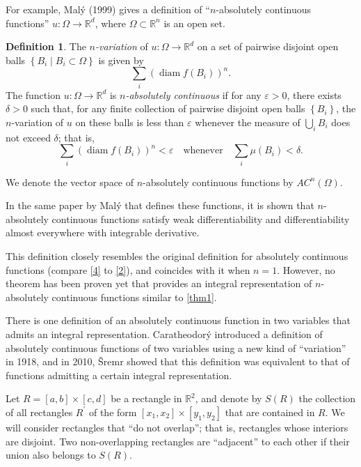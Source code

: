 \documentclass[11pt,leqno]{article}
\theoremstyle{plain}
\theoremstyle{definition}
\newtheorem{definition/}[lem]{Definition}
\newenvironment{definition}
  {\renewcommand{\qedsymbol}{\textdagger}%
   \pushQED{\qed}\begin{definition/}}
  {\popQED\end{definition/}}
\numberwithin{equation}{section}
\numberwithin{lem}{section}
\newcommand{\cbr}[1]{\left\{#1\right\}}
\DeclareMathOperator{\diam}{diam}
\begin{document}
For example, Mal\'y (1999) gives a definition of ``$n$-absolutely continuous functions'' $u\colon \Omega\to \mathbb R^d$, where $\Omega\subset \mathbb R^n$ is an open set.
\begin{definition}
    The \textit{$n$-variation} of $u\colon \Omega\to\mathbb R^d$ on a set of pairwise disjoint open balls $\cbr{B_i\mid B_i\subset \Omega}$ is given by
    \begin{equation}
        \sum_i (\diam f(B_i))^n.
    \end{equation}
    The function $u\colon \Omega\to\mathbb R^d$ is \textit{$n$-absolutely continuous} if for any $\varepsilon>0$, there exists $\delta >0$ such that, for any finite collection of pairwise disjoint open balls $\cbr{B_i}$, the $n$-variation of $u$ on these balls is less than $\varepsilon$ whenever the measure of $\bigcup_iB_i$ does not exceed $\delta$; that is,
    \begin{equation}\label{4}
        \sum_i (\diam f(B_i))^n <\varepsilon\quad\text{whenever}\quad \sum_i\mu(B_i) < \delta.
    \end{equation}
    
    We denote the vector space of $n$-absolutely continuous functions by $AC^n(\Omega)$.
\end{definition}

In the same paper by Mal\'y that defines these functions, it is shown that $n$-absolutely continuous functions satisfy weak differentiability and differentiability almost everywhere with integrable derivative.

This definition closely resembles the original definition for absolutely continuous functions (compare \eqref{4} to \eqref{2}), and coincides with it when $n=1$. However, no theorem has been proven yet that provides an integral representation of $n$-absolutely continuous functions similar to \cref{thm1}.

There is one definition of an absolutely continuous function in two variables that admits an integral representation. Caratheodor\'y introduced a definition of absolutely continuous functions of two variables using a new kind of ``variation'' in 1918, and in 2010, \v Sremr showed that this definition was equivalent to that of functions admitting a certain integral representation.

Let $R = [a,b]\times[c,d]$ be a rectangle in $\mathbb R^2$, and denote by $S(R)$ the collection of all rectangles $R^\prime$ of the form $[x_1,x_2]\times[y_1,y_2]$ that are contained in $R$. We will consider rectangles that ``do not overlap''; that is, rectangles whose interiors are disjoint. Two non-overlapping rectangles are ``adjacent'' to each other if their union also belongs to $S(R)$.
\end{document}
